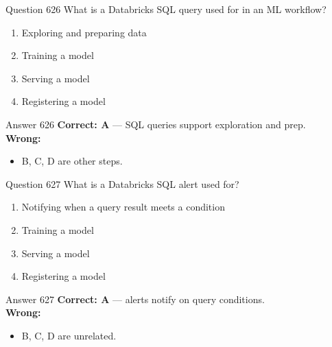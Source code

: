 \documentclass[aspectratio=169,11pt]{beamer}
\begin{document}
	\begin{frame}{Question 626}
		What is a Databricks SQL query used for in an ML workflow?
		\begin{enumerate}[label=\Alph*.]
			\item Exploring and preparing data
			\item Training a model
			\item Serving a model
			\item Registering a model
		\end{enumerate}
	\end{frame}
	\begin{frame}{Answer 626}
		\textbf{Correct: A} --- SQL queries support exploration and prep.\\
		\vspace{0.5em}
		\textbf{Wrong:}
		\begin{itemize}
			\item B, C, D are other steps.
		\end{itemize}
	\end{frame}
	
	\begin{frame}{Question 627}
		What is a Databricks SQL alert used for?
		\begin{enumerate}[label=\Alph*.]
			\item Notifying when a query result meets a condition
			\item Training a model
			\item Serving a model
			\item Registering a model
		\end{enumerate}
	\end{frame}
	\begin{frame}{Answer 627}
		\textbf{Correct: A} --- alerts notify on query conditions.\\
		\vspace{0.5em}
		\textbf{Wrong:}
		\begin{itemize}
			\item B, C, D are unrelated.
		\end{itemize}
	\end{frame}
	
\end{document}
